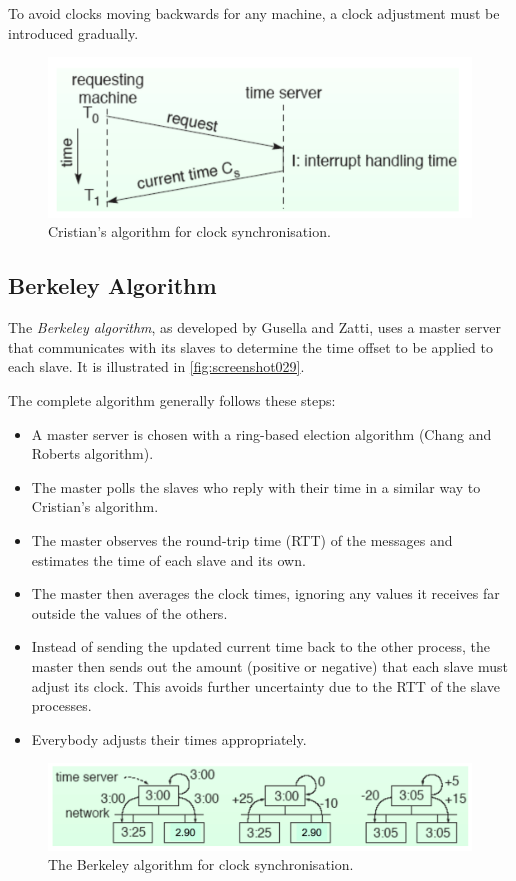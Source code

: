 To avoid clocks moving backwards for any machine, a clock adjustment must be introduced gradually.

\begin{figure}
\centering
\includegraphics[width=0.7\linewidth]{screenshot028}
\caption{Cristian's algorithm for clock synchronisation.}
\label{fig:screenshot028}
\end{figure}

\subsection{Berkeley Algorithm}
The \textit{Berkeley algorithm}, as developed by Gusella and Zatti, uses a master server that communicates with its slaves to determine the time offset to be applied to each slave. It is illustrated in \autoref{fig:screenshot029}.

The complete algorithm generally follows these steps:
\begin{itemize}
\item A master server is chosen with a ring-based election algorithm (Chang and 
Roberts algorithm). 
\item The master polls the slaves who reply with their time in a similar way to Cristian's algorithm.
\item The master observes the round-trip time (RTT) of the messages and estimates the time of each slave and its own.  
\item The master then averages the clock times, ignoring any values it receives far outside the values of the others. 
\item Instead of sending the updated current time back to the other process, the master
 then sends out the amount (positive or negative) that each slave must adjust its clock. This avoids further uncertainty due to the RTT of the slave processes.  
\item Everybody adjusts their times appropriately.
\end{itemize}

\begin{figure}
\centering
\includegraphics[width=0.7\linewidth]{screenshot029}
\caption{The Berkeley algorithm for clock synchronisation.}
\label{fig:screenshot029}
\end{figure}


